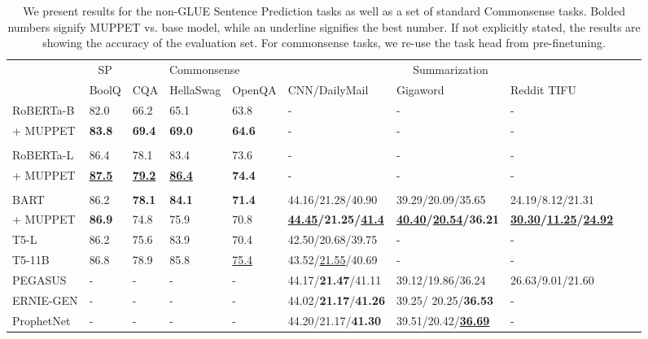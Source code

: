 \documentclass[11pt,a4paper]{article}
\begin{document}
\begin{table*}[th]
\centering
\small
\begin{tabular}{@{}lllll|lllll@{}}
\toprule
 & \multicolumn{1}{c}{SP} & \multicolumn{3}{c}{Commonsense} & \multicolumn{3}{c}{Summarization}\\
 \cmidrule(lr){2-2}\cmidrule(lr){3-5}\cmidrule(lr){6-8} 
 & 
  BoolQ &
  CQA &
  HellaSwag &
  OpenQA & 
  CNN/DailyMail & 
  Gigaword      & 
  Reddit TIFU\\ \midrule

RoBERTa-B   & 82.0       & 66.2 & 65.1     & 63.8  & - & - & - \\ 
\quad\quad + MUPPET        & \textbf{83.8}         &   \textbf{69.4}        &  \textbf{69.0}                    & \textbf{64.6}  & - & - & - \\ \\
RoBERTa-L & 86.4   & 78.1  & 83.4         &     73.6          & - & - & - \\
\quad\quad + MUPPET        & \textbf{\underline{87.5}}         &  \textbf{\underline{79.2}}    &   \textbf{\underline{86.4}}        &    \textbf{74.4}   & - & - & - \\ 
\\
BART & 86.2       & \textbf{78.1}     & \textbf{84.1}      & \textbf{71.4}   & 44.16/21.28/40.90 & 39.29/20.09/35.65 & 24.19/8.12/21.31       \\
\quad\quad + MUPPET        & \textbf{86.9}         &  74.8    &   75.9        &    70.8   & \textbf{\underline{44.45}/21.25/\underline{41.4}} & \textbf{\underline{40.40}/\underline{20.54}/36.21} & \textbf{\underline{30.30}/\underline{11.25}/\underline{24.92}}\\ \midrule
T5-L & 86.2 & 75.6 & 83.9 & 70.4 & 42.50/20.68/39.75 & - & -\\
T5-11B & 86.8 & 78.9 & 85.8 & \underline{75.4} & 43.52/\underline{21.55}/40.69 & - & -\\
PEGASUS & - & - & - & -  & 44.17/\textbf{21.47}/41.11 & 39.12/19.86/36.24 & 26.63/9.01/21.60\\
ERNIE-GEN & - & - & - & - & 44.02/\textbf{21.17}/\textbf{41.26} & 39.25/ 20.25/\textbf{36.53} & -\\
ProphetNet & - & - & - & - & 44.20/21.17/\textbf{41.30} & 39.51/20.42/\textbf{\underline{36.69}} & - \\
\bottomrule
\end{tabular}
\caption{We present results for the non-GLUE Sentence Prediction tasks as well as a set of standard Commonsense tasks. Bolded numbers signify MUPPET vs. base model, while an underline signifies the best number. If not explicitly stated, the results are showing the accuracy of the evaluation set. For commonsense tasks, we re-use the task head from pre-finetuning.}
\label{table:mtl_sp_commonsense}
\end{table*}
\end{document}
